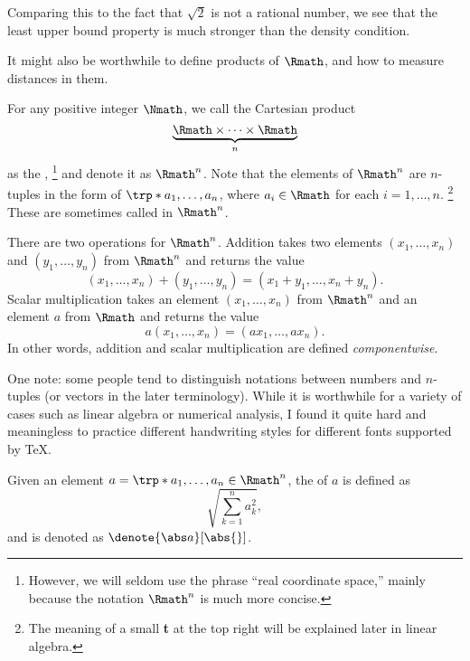 Comparing this to the fact that \(\sqrt{2}\) is not a rational number,
we see that
the least upper bound property is much stronger
than the density condition.

It might also be worthwhile to define products of \(\Rmath\),
and how to measure distances in them.

\begin{definition}
    \label{def:Rn}
    For any positive integer \(\Nmath\),
    we call the Cartesian product
    \[
        \underbrace{\Rmath\times\dots\times\Rmath}_{n}
    \]
    as the ,%
    \footnote{
        However, we will seldom use the phrase
        ``real coordinate space,''
        mainly because
        the notation \(\Rmath^n\) is much more concise.
    }
    and denote it as \(\Rmath^n\).
    Note that the elements of \(\Rmath^n\)
    are \(n\)-tuples in the form of \(\trp*{a_1,\dots,a_n}\),
    where \(a_i\in\Rmath\) for each \(i=1,\dots,n\).%
    \footnote{
        The meaning of a small \textbf t at the top right
        will be explained later in linear algebra.
    }
    These are sometimes called  in \(\Rmath^n\).

    There are two operations for \(\Rmath^n\).
    Addition takes two elements
    \((x_1,\dots,x_n)\) and \((y_1,\dots,y_n)\) from \(\Rmath^n\)
    and returns the value
    \[
        (x_1,\dots,x_n)+(y_1,\dots,y_n)
        =(x_1+y_1,\dots,x_n+y_n).
    \]
    Scalar multiplication takes
    an element \((x_1,\dots,x_n)\) from \(\Rmath^n\)
    and an element \(a\) from \(\Rmath\)
    and returns the value
    \[
        a(x_1,\dots,x_n)
        =(ax_1,\dots,ax_n).
    \]
    In other words,
    addition and scalar multiplication are defined \emph{componentwise}.
\end{definition}

One note:
some people tend to distinguish notations
between numbers and \(n\)-tuples (or vectors in the later terminology).
While it is worthwhile for a variety of cases
such as linear algebra or numerical analysis,
I found it quite hard and meaningless
to practice different handwriting styles
for different fonts supported by \TeX.

\begin{definition}
    \label{def:abs}
    Given an element \(a=\trp*{a_1,\dots,a_n}\in\Rmath^n\),
    the  of \(a\)
    is defined as
    \[
        \sqrt{\sum_{k=1}^{n}a_k^2},
    \]
    and is denoted as \(\denote{\abs a}[\abs{}]\).
\end{definition}

